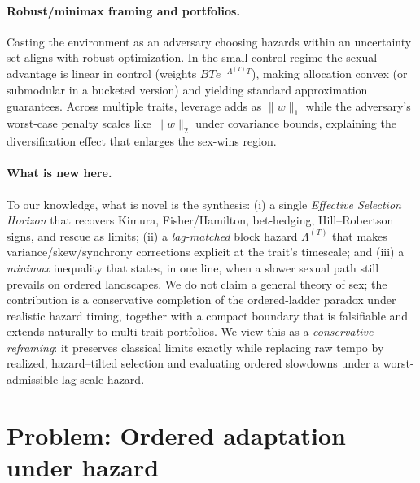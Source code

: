 \documentclass[11pt]{article}
\theoremstyle{upright}
\newcommand{\hazT}[1]{\Lambda^{(#1)}}          %
\begin{document}
\paragraph{Robust/minimax framing and portfolios.}
Casting the environment as an adversary choosing hazards within an uncertainty set aligns with robust optimization. In the small-control regime the sexual advantage is linear in control (weights $B T e^{-\hazT{T}T}$), making allocation convex (or submodular in a bucketed version) and yielding standard approximation guarantees. Across multiple traits, leverage adds as $\|w\|_1$ while the adversary’s worst-case penalty scales like $\|w\|_2$ under covariance bounds, explaining the diversification effect that enlarges the sex-wins region.

\paragraph{What is new here.}
To our knowledge, what is novel is the synthesis: (i) a single \emph{Effective Selection Horizon} that recovers Kimura, Fisher/Hamilton, bet-hedging, Hill–Robertson signs, and rescue as limits; (ii) a \emph{lag-matched} block hazard $\hazT{T}$ that makes variance/skew/synchrony corrections explicit at the trait’s timescale; and (iii) a \emph{minimax} inequality that states, in one line, when a slower sexual path still prevails on ordered landscapes. We do not claim a general theory of sex; the contribution is a conservative completion of the ordered-ladder paradox under realistic hazard timing, together with a compact boundary that is falsifiable and extends naturally to multi-trait portfolios. We view this as a \emph{conservative reframing}: it preserves classical limits exactly while replacing raw tempo by realized, hazard–tilted selection and evaluating ordered slowdowns under a worst-admissible lag-scale hazard.


\section{Problem: Ordered adaptation under hazard}
\end{document}
